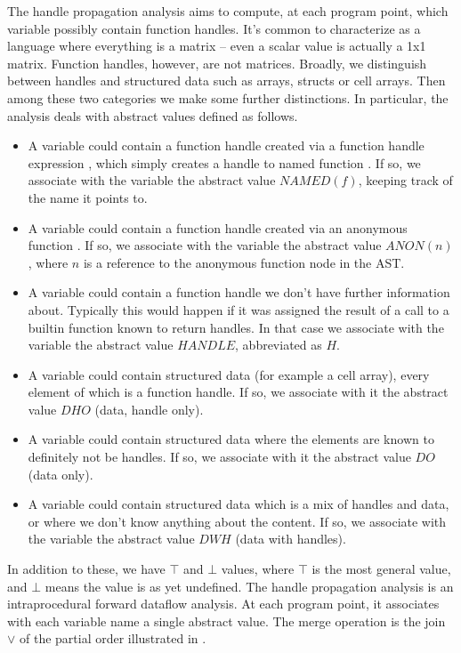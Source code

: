 The handle propagation analysis aims to compute, at each program point, which
variable possibly contain function handles. It's common to characterize
\matlab as a language where everything is a matrix -- even a scalar value is
actually a 1x1 matrix. Function handles, however, are not matrices. Broadly,
we distinguish between handles and structured data such as arrays, structs
or cell arrays. Then among these two categories we make some further
distinctions. In particular, the analysis deals with abstract values defined
as follows.

\begin{itemize}
  \item A variable could contain a function handle created via a function
    handle expression , which simply creates a handle to named
    function . If so, we associate with the variable the abstract value
    $NAMED(f)$, keeping track of the name it points to.
  \item A variable could contain a function handle created via an anonymous
    function . If so, we associate with the variable the
    abstract value $ANON(n)$, where $n$ is a reference to the
    anonymous function node in the AST.
  \item A variable could contain a function handle we don't have further
    information about. Typically this would happen if it was assigned the
    result of a call to a builtin function known to return handles. In that
    case we associate with the variable the abstract value $HANDLE$,
    abbreviated as $H$.
  \item A variable could contain structured data (for example a cell array),
    every element of which is a function handle. If so, we associate with it
    the abstract value $DHO$ (data, handle only).
  \item A variable could contain structured data where the elements are known
    to definitely not be handles. If so, we associate with it the abstract
    value $DO$ (data only).
  \item A variable could contain structured data which is a mix of handles
    and data, or where we don't know anything about the content. If so, we
    associate with the variable the abstract value $DWH$ (data with handles).
\end{itemize}

In addition to these, we have $\top$ and $\bot$ values, where $\top$ is the
most general value, and $\bot$ means the value is as yet undefined. The handle
propagation analysis is an intraprocedural forward dataflow analysis. At each
program point, it associates with each variable name a single abstract value.
The merge operation is the join $\vee$ of the partial order illustrated in
.

